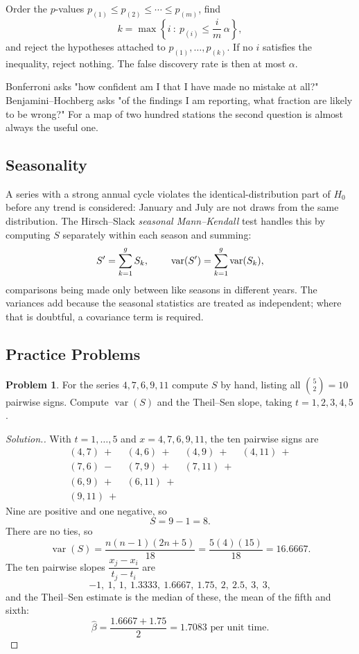 \documentclass[11pt,a4paper]{article}
\theoremstyle{definition}
\newtheorem{problemx}{Problem}[section]
\newenvironment{problem}{\begin{problemx}}{\end{problemx}}
\newenvironment{solution}
  {\renewcommand{\qedsymbol}{}\begin{proof}[\textit{Solution}.]}
  {\end{proof}}
\begin{document}
Order the $p$-values $p_{(1)} \leq p_{(2)} \leq \cdots \leq p_{(m)}$, find
$$k = \max\left\{ i \ :\ p_{(i)} \leq \dfrac{i}{m}\,\alpha \right\},$$
and reject the hypotheses attached to $p_{(1)}, \ldots, p_{(k)}$. If no $i$
satisfies the inequality, reject nothing. The false discovery rate is then at
most $\alpha$.

Bonferroni asks "how confident am I that I have made no mistake at all?"
Benjamini--Hochberg asks "of the findings I am reporting, what fraction are
likely to be wrong?" For a map of two hundred stations the second question is
almost always the useful one.

\subsection{Seasonality}

A series with a strong annual cycle violates the identical-distribution part of
$H_0$ before any trend is considered: January and July are not draws from the
same distribution. The Hirsch--Slack \emph{seasonal Mann--Kendall} test handles
this by computing $S$ separately within each season and summing:
$$S' = \sum^{g}_{k=1} S_k, \hspace{0.8cm}
\operatorname{var}(S') = \sum^{g}_{k=1}\operatorname{var}(S_k),$$
comparisons being made only between like seasons in different years. The
variances add because the seasonal statistics are treated as independent; where
that is doubtful, a covariance term is required.

\subsection{Practice Problems}

\begin{problem}
For the series $4, 7, 6, 9, 11$ compute $S$ by hand, listing all
$\binom{5}{2} = 10$ pairwise signs. Compute $\operatorname{var}(S)$ and the
Theil--Sen slope, taking $t = 1, 2, 3, 4, 5$.
\end{problem}

\begin{solution}
With $t = 1,\ldots,5$ and $x = 4, 7, 6, 9, 11$, the ten pairwise signs are
$$\begin{array}{llll}
(4,7)\ + & (4,6)\ + & (4,9)\ + & (4,11)\ +\\
(7,6)\ - & (7,9)\ + & (7,11)\ + &\\
(6,9)\ + & (6,11)\ + & &\\
(9,11)\ + & & &
\end{array}$$
Nine are positive and one negative, so
$$S = 9 - 1 = 8 .$$
There are no ties, so
$$\operatorname{var}(S) = \dfrac{n(n-1)(2n+5)}{18} = \dfrac{5(4)(15)}{18}
= 16.6667 .$$
The ten pairwise slopes $\dfrac{x_j - x_i}{t_j - t_i}$ are
$$-1,\ 1,\ 1,\ 1.3333,\ 1.6667,\ 1.75,\ 2,\ 2.5,\ 3,\ 3,$$
and the Theil--Sen estimate is the median of these, the mean of the fifth and
sixth:
$$\widehat{\beta} = \dfrac{1.6667 + 1.75}{2} = 1.7083 \text{ per unit time}.$$
\end{solution}
\end{document}
